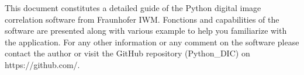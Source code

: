 This document constitutes a detailed guide of the Python digital image correlation software from Fraunhofer IWM. Fonctions and capabilities of the software are presented along with various example to help you familiarize with the application. For any other information or any comment on the software please contact the author or visit the GitHub repository (Python\_DIC) on https://github.com/.
